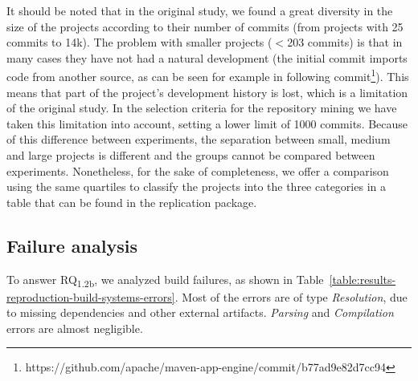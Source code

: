 It should be noted that in the original study, we found a great diversity in the size of the projects according to their number of commits (from projects with 25 commits to 14k).
The problem with smaller projects ($<$203 commits) is that in many cases they have not had a natural development (the initial commit imports code from another source, as can be seen for example in following commit\footnote{https://github.com/apache/maven-app-engine/commit/b77ad9e82d7cc94}).
This means that part of the project's development history is lost, which is a limitation of the original study.
In the selection criteria for the repository mining we have taken this limitation into account, setting a lower limit of 1000 commits.
Because of this difference between experiments, the separation between small, medium and large projects is different and the groups cannot be compared between experiments. 
Nonetheless, for the sake of completeness, we offer a comparison using the same quartiles to classify the projects into the three categories in a table that can be found in the replication package.

\vspace{0.2cm}

\subsection{Failure analysis}

To answer RQ\textsubscript{1.2b}, we analyzed build failures, as shown in Table~\ref{table:results-reproduction-build-systems-errors}. Most of the errors are of type \textit{Resolution}, due to missing dependencies and other external artifacts. \textit{Parsing} and \textit{Compilation} errors are almost negligible.

